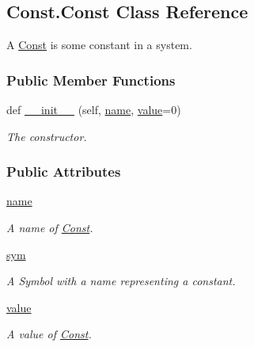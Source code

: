 \hypertarget{classConst_1_1Const}{}\subsection{Const.\+Const Class Reference}
\label{classConst_1_1Const}


A \hyperlink{classConst_1_1Const}{Const} is some constant in a system.  


\subsubsection*{Public Member Functions}
\begin{DoxyCompactItemize}
\item 
def \hyperlink{classConst_1_1Const_a37a3c8de2cdd907d0283c3f38aad13af}{\+\_\+\+\_\+init\+\_\+\+\_\+} (self, \hyperlink{classConst_1_1Const_a9c35d073f6c11a53c69e6ff49fc533fd}{name}, \hyperlink{classConst_1_1Const_a6544b1f996da56e81a7c82fd1bf4562f}{value}=0)
\begin{DoxyCompactList}\small\item\em The constructor. \end{DoxyCompactList}\end{DoxyCompactItemize}
\subsubsection*{Public Attributes}
\begin{DoxyCompactItemize}
\item 
\hyperlink{classConst_1_1Const_a9c35d073f6c11a53c69e6ff49fc533fd}{name}
\begin{DoxyCompactList}\small\item\em A name of \hyperlink{classConst_1_1Const}{Const}. \end{DoxyCompactList}\item 
\hyperlink{classConst_1_1Const_a26c0914afa6a1dc500197d3e2f34b08d}{sym}
\begin{DoxyCompactList}\small\item\em A Symbol with a {\ttfamily name} representing a constant. \end{DoxyCompactList}\item 
\hyperlink{classConst_1_1Const_a6544b1f996da56e81a7c82fd1bf4562f}{value}
\begin{DoxyCompactList}\small\item\em A value of \hyperlink{classConst_1_1Const}{Const}. \end{DoxyCompactList}\end{DoxyCompactItemize}


